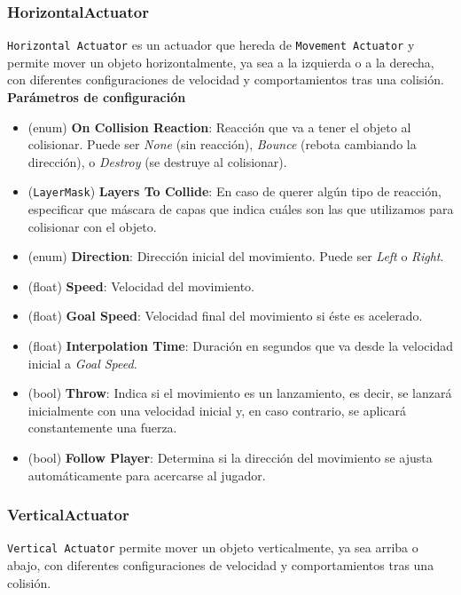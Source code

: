 \subsubsection{HorizontalActuator}
\texttt{Horizontal Actuator} es un actuador que hereda de \texttt{Movement Actuator} y permite mover un objeto horizontalmente, ya sea a la izquierda o a la derecha, con diferentes configuraciones de velocidad y comportamientos tras una colisión.\\

\textbf{Parámetros de configuración}
\begin{itemize}
	\item (enum) \textbf{On Collision Reaction}: Reacción que va a tener el objeto al colisionar. Puede ser \textit{None} (sin reacción), \textit{Bounce} (rebota cambiando la dirección), o \textit{Destroy} (se destruye al colisionar).
	\item (\texttt{LayerMask}) \textbf{Layers To Collide}: En caso de querer algún tipo de reacción, especificar que máscara de capas que indica cuáles son las que utilizamos para colisionar con el objeto.
	\item (enum) \textbf{Direction}: Dirección inicial del movimiento. Puede ser \textit{Left} o \textit{Right}.
	\item (float) \textbf{Speed}: Velocidad del movimiento.
	\item (float) \textbf{Goal Speed}: Velocidad final del movimiento si éste es acelerado.
	\item (float) \textbf{Interpolation Time}: Duración en segundos que va desde la velocidad inicial a \textit{Goal Speed}.
	\item (bool) \textbf{Throw}: Indica si el movimiento es un lanzamiento, es decir, se lanzará inicialmente con una velocidad inicial y, en caso contrario, se aplicará constantemente una fuerza.
	\item (bool) \textbf{Follow Player}: Determina si la dirección del movimiento se ajusta automáticamente para acercarse al jugador.
\end{itemize}

\subsubsection{VerticalActuator}
\texttt{Vertical Actuator} permite mover un objeto verticalmente, ya sea arriba o abajo, con diferentes configuraciones de velocidad y comportamientos tras una colisión.\\

